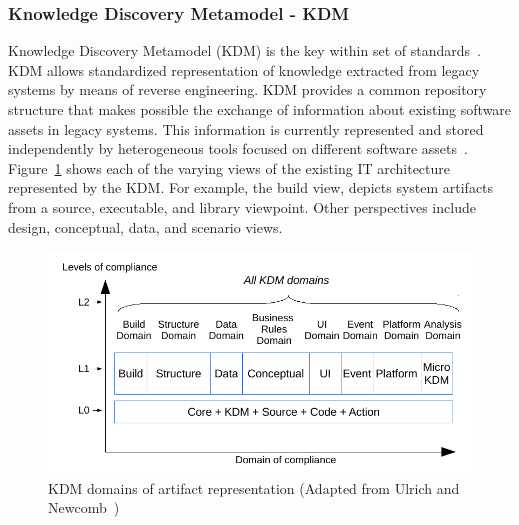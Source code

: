 \documentclass[a4paper,twoside]{article}
\begin{document}

\subsubsection{Knowledge Discovery Metamodel - KDM}\label{subsec:KDM}

Knowledge Discovery Metamodel (KDM) is the key within set of standards~\cite{1686216}. KDM allows standardized representation of knowledge extracted from legacy systems by means of reverse engineering. KDM provides a common repository structure that makes possible the exchange of information about existing software assets in legacy systems. This information is currently represented and stored independently by heterogeneous tools focused on different software assets~\cite[p.~32]{Ulrich:2010:IST:1841736}. Figure~\ref{kdm} shows each of the varying views of the existing IT architecture represented by the KDM. For example, the build view, depicts system artifacts from a source, executable, and library viewpoint. Other perspectives include design, conceptual, data, and scenario views.

\begin{figure}[!ht]
\centering
  \includegraphics[scale=0.58]{figuras/kdm}
\caption{KDM domains of artifact representation (Adapted from Ulrich and Newcomb~\cite{Ulrich:2010:IST:1841736})}
\label{kdm}
\end{figure}
\end{document}

